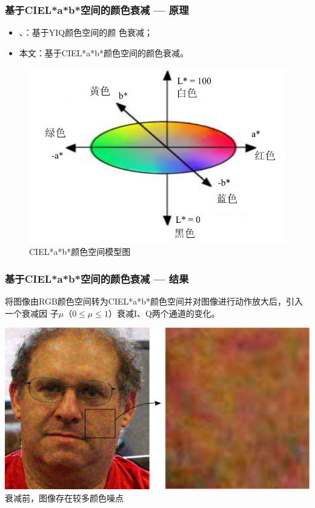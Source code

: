 \documentclass[xcolor=svgnames,serif,table]{beamer}
\begin{document}
\begin{frame}
  \frametitle{基于CIEL*a*b*空间的颜色衰减 --- 原理}
  \begin{itemize}
  \item \cite{wu2012eulerian}、\cite{Wadhwa2013PhaseBased}：基于YIQ颜色空间的颜
    色衰减；
  \item 本文：基于CIEL*a*b*颜色空间的颜色衰减。
  \end{itemize}

  \begin{figure}[htbp]
  \scriptsize
  \centering
  \includegraphics[width=.5\textwidth]{color-plate.pdf}\\
  CIEL*a*b*颜色空间模型图
  \end{figure}
\end{frame}

\begin{frame}
  \frametitle{基于CIEL*a*b*空间的颜色衰减 --- 结果}
  \small
  将图像由RGB颜色空间转为CIEL*a*b*颜色空间并对图像进行动作放大后，引入一个衰减因
  子\alert{$\mu$}（$0\le \mu \le 1$）衰减I、Q两个通道的变化。

  \begin{center}
    \includegraphics[width=.8\textwidth]{attenuation-before.png}\\
    衰减前，图像存在较多颜色噪点\\
  \end{center}
\end{frame}
\end{document}
